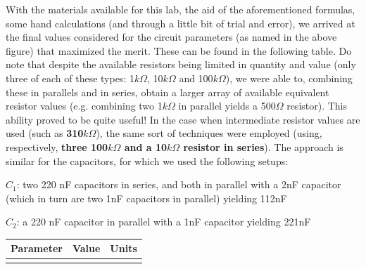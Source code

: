 With the materials available for this lab, the aid of the aforementioned formulas, some hand calculations (and through a little bit of trial and error), we arrived at the final values considered for the circuit parameters (as named in the above figure) that maximized the merit. These can be found in the following table. Do note that despite the available resistors being limited in quantity and value (only three of each of these types: 1$k\Omega$, 10$k\Omega$ and 100$k\Omega$), we were able to, combining these in parallels and in series, obtain a larger array of available equivalent resistor values (e.g. combining two 1$k\Omega$ in parallel yields a 500$\Omega$ resistor). This ability proved to be quite useful! In the case when intermediate resistor values are used (such as \textbf{310$k\Omega$}), the same sort of techniques were employed (using, respectively, \textbf{three 100$k\Omega$ and a 10$k\Omega$ resistor in series}). The approach is similar for the capacitors, for which we used the following setups:

$C_1$: two 220 nF capacitors in series, and both in parallel with a 2nF capacitor (which in turn are two 1nF capacitors in parallel) yielding 112nF

$C_2$: a 220 nF capacitor in parallel with a 1nF capacitor yielding 221nF


\hfill
 \parbox{1\linewidth}{
  \centering
  \begin{tabular}{|l|l|r|}
    \hline    
    {\bf Parameter} & {\bf Value} & {\bf Units }\\ \hline
    
  \label{tab:params}
  \end{tabular}
  }
\par

